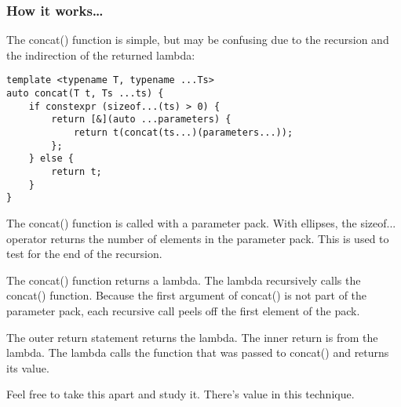 \subsubsection{How it works…}

The concat() function is simple, but may be confusing due to the recursion and the indirection of the returned lambda:

\begin{lstlisting}[style=styleCXX]
template <typename T, typename ...Ts>
auto concat(T t, Ts ...ts) {
	if constexpr (sizeof...(ts) > 0) {
		return [&](auto ...parameters) {
			return t(concat(ts...)(parameters...));
		};
	} else {
		return t;
	}
}
\end{lstlisting}

The concat() function is called with a parameter pack. With ellipses, the sizeof... operator returns the number of elements in the parameter pack. This is used to test for the end of the recursion.

The concat() function returns a lambda. The lambda recursively calls the concat() function. Because the first argument of concat() is not part of the parameter pack, each recursive call peels off the first element of the pack.

The outer return statement returns the lambda. The inner return is from the lambda. The lambda calls the function that was passed to concat() and returns its value.

Feel free to take this apart and study it. There's value in this technique.





